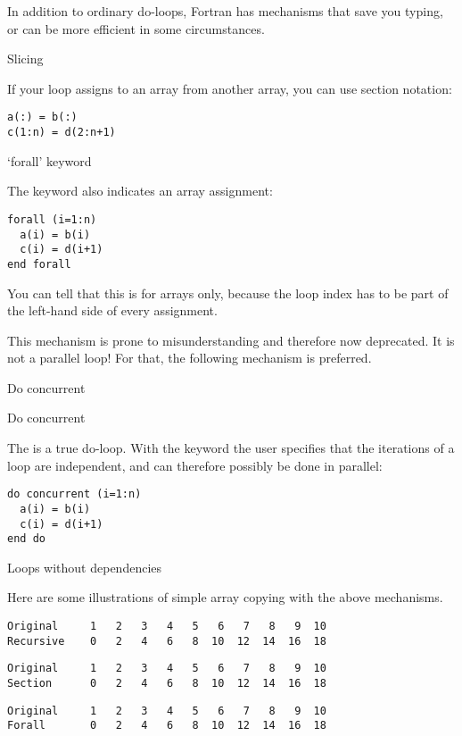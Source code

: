 In addition to ordinary do-loops, Fortran has mechanisms that save you
typing, or can be more efficient in some circumstances.

 {Slicing}

If your loop assigns to an array from another array,
  you can use section notation:
\begin{verbatim}
a(:) = b(:)
c(1:n) = d(2:n+1)
\end{verbatim}

 {`forall' keyword}

The  keyword also indicates an array assignment:
\begin{verbatim}
forall (i=1:n)
  a(i) = b(i)
  c(i) = d(i+1)
end forall
\end{verbatim}
You can tell that this is for arrays only, because the loop index has
to be part of the left-hand side of every assignment.

This mechanism is prone to misunderstanding and therefore now
deprecated.
It is not a parallel loop! For that, the following mechanism is preferred.

 {Do concurrent}

\begin{block}{Do concurrent}
  \label{sl:farray-concurrent}

  The  is a true do-loop. With the
   keyword the user specifies that the
  iterations of a loop are independent, and can therefore possibly be
  done in parallel:
\begin{verbatim}
do concurrent (i=1:n)
  a(i) = b(i)
  c(i) = d(i+1)
end do
\end{verbatim}
\end{block}

 {Loops without dependencies}

Here are some illustrations of simple array copying with the above
mechanisms.

\begin{verbatim}
Original     1   2   3   4   5   6   7   8   9  10
Recursive    0   2   4   6   8  10  12  14  16  18
\end{verbatim}

\begin{verbatim}
Original     1   2   3   4   5   6   7   8   9  10
Section      0   2   4   6   8  10  12  14  16  18
\end{verbatim}

\begin{verbatim}
Original     1   2   3   4   5   6   7   8   9  10
Forall       0   2   4   6   8  10  12  14  16  18
\end{verbatim}

